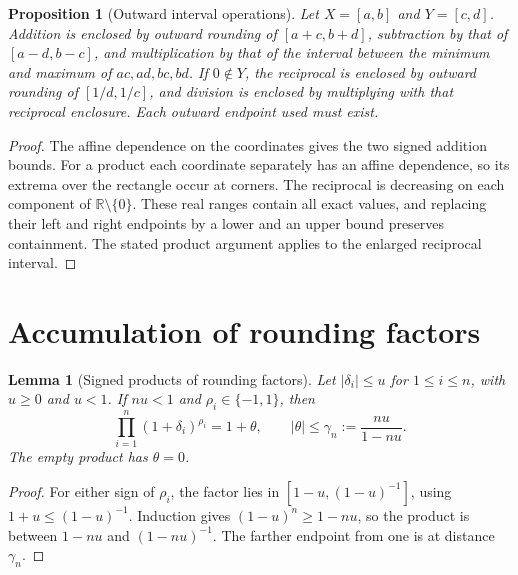 \documentclass[11pt,oneside,openany]{book}
\theoremstyle{plain}
\newtheorem{lemma}[theorem]{Lemma}
\newtheorem{proposition}[theorem]{Proposition}
\theoremstyle{definition}
\theoremstyle{remark}
\begin{document}
\begin{proposition}[Outward interval operations]\label{p206:W05}
Let \(X=[a,b]\) and \(Y=[c,d]\). Addition is enclosed by outward
rounding of \([a+c,b+d]\), subtraction by that of \([a-d,b-c]\),
and multiplication by that of the interval between the minimum
and maximum of \(ac,ad,bc,bd\). If \(0\notin Y\), the reciprocal
is enclosed by outward rounding of \([1/d,1/c]\), and division
is enclosed by multiplying with that reciprocal enclosure.
Each outward endpoint used must exist.
\end{proposition}
\begin{proof}
The affine dependence on the coordinates gives the two signed
addition bounds. For a product each coordinate separately has
an affine dependence, so its extrema over the rectangle occur
at corners. The reciprocal is decreasing on each component of
\(\mathbb R\setminus\{0\}\). These real ranges contain all exact
values, and replacing their left and right endpoints by a lower
and an upper bound preserves containment. The stated product
argument applies to the enlarged reciprocal interval.
\end{proof}

\section{Accumulation of rounding factors}

\begin{lemma}[Signed products of rounding factors]\label{p206:W06}
Let \(|\delta_i|\le u\) for \(1\le i\le n\), with \(u\ge0\)
and \(u<1\). If \(nu<1\) and \(\rho_i\in\{-1,1\}\), then
\[
 \prod_{i=1}^n(1+\delta_i)^{\rho_i}=1+\theta,\qquad
 |\theta|\le \gamma_n:=\frac{nu}{1-nu}.
\]
The empty product has \(\theta=0\).
\end{lemma}
\begin{proof}
For either sign of \(\rho_i\), the factor lies in
\([1-u,(1-u)^{-1}]\), using \(1+u\le(1-u)^{-1}\).
Induction gives \((1-u)^n\ge1-nu\), so the product is between
\(1-nu\) and \((1-nu)^{-1}\). The farther endpoint from one
is at distance \(\gamma_n\).
\end{proof}
\end{document}
